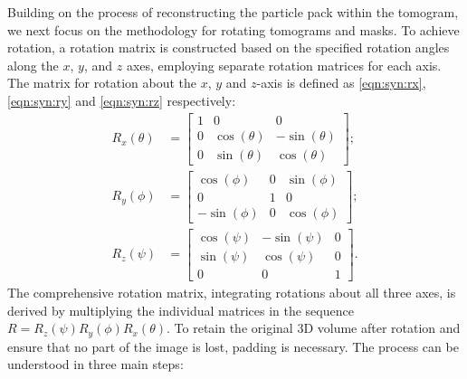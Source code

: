\documentclass[preprint,12pt]{elsarticle}
\begin{document}
Building on the process of reconstructing the particle pack within the tomogram, we next focus on the methodology for rotating tomograms and masks. 
To achieve rotation, a rotation matrix is constructed based on the specified rotation angles along the $x$, $y$, and $z$ axes, employing separate rotation matrices for each axis. 
The matrix for rotation about the $x$, $y$ and $z$-axis is defined as \eqref{eqn:syn:rx}, \eqref{eqn:syn:ry} and \eqref{eqn:syn:rz} respectively:
\begin{align}
    R_x(\theta) &= \begin{bmatrix} 1 & 0 & 0 \\ 0 & \cos(\theta) & -\sin(\theta) \\ 0 & \sin(\theta) & \cos(\theta) \end{bmatrix}; \label{eqn:syn:rx} \\
    R_y(\phi)   &= \begin{bmatrix} \cos(\phi) & 0 & \sin(\phi) \\ 0 & 1 & 0 \\ -\sin(\phi) & 0 & \cos(\phi) \end{bmatrix}; \label{eqn:syn:ry} \\
    R_z(\psi)   &= \begin{bmatrix} \cos(\psi) & -\sin(\psi) & 0 \\ \sin(\psi) & \cos(\psi) & 0 \\ 0 & 0 & 1 \end{bmatrix}. \label{eqn:syn:rz}
\end{align}
The comprehensive rotation matrix, integrating rotations about all three axes, is derived by multiplying the individual matrices in the sequence \(R = R_z(\psi)R_y(\phi)R_x(\theta)\). 
To retain the original 3D volume after rotation and ensure that no part of the image is lost, padding is necessary. 
The process can be understood in three main steps:
\end{document}
